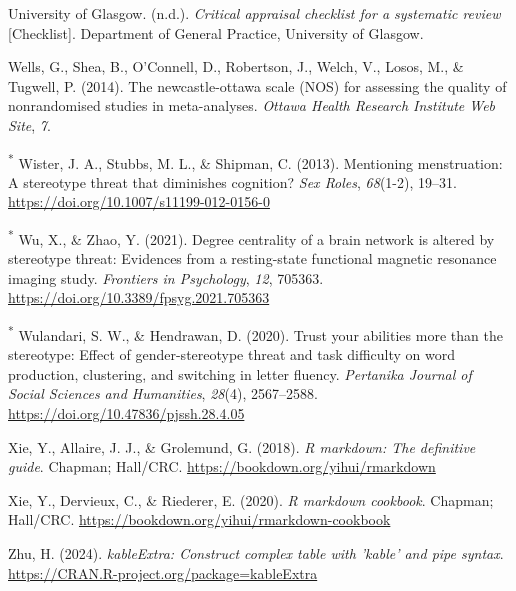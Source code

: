 \documentclass[
  stu,floatsintext]{apa7}
\newlength{\cslhangindent}
\newenvironment{CSLReferences}[2] %
 {\begin{list}{}{%
  \setlength{\itemindent}{0pt}
  \setlength{\leftmargin}{0pt}
  \setlength{\parsep}{0pt}
  \ifodd #1
   \setlength{\leftmargin}{\cslhangindent}
   \setlength{\itemindent}{-1\cslhangindent}
  \fi
  \setlength{\itemsep}{#2\baselineskip}}}
 {\end{list}}
\begin{document}
\begin{CSLReferences}{1}{0}
University of Glasgow. (n.d.). \emph{Critical appraisal checklist for a systematic review} {[}Checklist{]}. Department of General Practice, University of Glasgow.

Wells, G., Shea, B., O'Connell, D., Robertson, J., Welch, V., Losos, M., \& Tugwell, P. (2014). The newcastle-ottawa scale ({NOS}) for assessing the quality of nonrandomised studies in meta-analyses. \emph{Ottawa Health Research Institute Web Site}, \emph{7}.

\textsuperscript{*} Wister, J. A., Stubbs, M. L., \& Shipman, C. (2013). Mentioning menstruation: A stereotype threat that diminishes cognition? \emph{Sex Roles}, \emph{68}(1-2), 19--31. \url{https://doi.org/10.1007/s11199-012-0156-0}

\textsuperscript{*} Wu, X., \& Zhao, Y. (2021). Degree centrality of a brain network is altered by stereotype threat: {Evidences} from a resting-state functional magnetic resonance imaging study. \emph{Frontiers in Psychology}, \emph{12}, 705363. \url{https://doi.org/10.3389/fpsyg.2021.705363}

\textsuperscript{*} Wulandari, S. W., \& Hendrawan, D. (2020). Trust your abilities more than the stereotype: {Effect} of gender-stereotype threat and task difficulty on word production, clustering, and switching in letter fluency. \emph{Pertanika Journal of Social Sciences and Humanities}, \emph{28}(4), 2567--2588. \url{https://doi.org/10.47836/pjssh.28.4.05}

Xie, Y., Allaire, J. J., \& Grolemund, G. (2018). \emph{R markdown: The definitive guide}. Chapman; Hall/CRC. \url{https://bookdown.org/yihui/rmarkdown}

Xie, Y., Dervieux, C., \& Riederer, E. (2020). \emph{R markdown cookbook}. Chapman; Hall/CRC. \url{https://bookdown.org/yihui/rmarkdown-cookbook}

Zhu, H. (2024). \emph{kableExtra: Construct complex table with 'kable' and pipe syntax}. \url{https://CRAN.R-project.org/package=kableExtra}

\end{CSLReferences}


\clearpage
\renewcommand{\listfigurename}{Figure captions}

\clearpage
\renewcommand{\listtablename}{Table captions}
\end{document}
